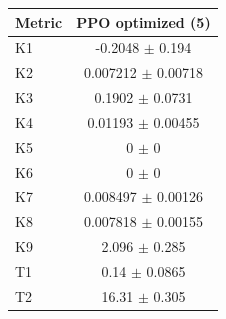 \begin{tabular}{lc}
\toprule
Metric & PPO optimized (5) \\
\midrule
K1 & -0.2048 $\pm$ 0.194 \\
K2 & 0.007212 $\pm$ 0.00718 \\
K3 & 0.1902 $\pm$ 0.0731 \\
K4 & 0.01193 $\pm$ 0.00455 \\
K5 & 0 $\pm$ 0 \\
K6 & 0 $\pm$ 0 \\
K7 & 0.008497 $\pm$ 0.00126 \\
K8 & 0.007818 $\pm$ 0.00155 \\
K9 & 2.096 $\pm$ 0.285 \\
T1 & 0.14 $\pm$ 0.0865 \\
T2 & 16.31 $\pm$ 0.305 \\
\bottomrule
\end{tabular}
